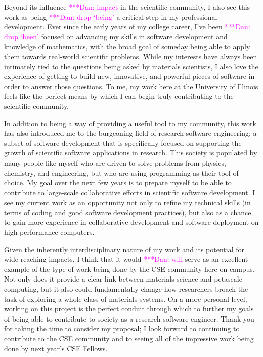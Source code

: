 \documentclass{article}
\newcommand{\katznote}[1]{ {\textcolor{magenta}    { ***Dan:      #1 }}}
\begin{document}
\bigskip

Beyond its influence \katznote{impact} in the scientific community, I also see this work as being \katznote{drop `being'} a critical step in my professional development. Ever since the early years of my college career, I've been \katznote{drop `been'} focused on advancing my skills in software development and knowledge of mathematics, with the broad goal of someday being able to apply them towards real-world scientific problems. While my interests have always been intimately tied to the questions being asked by materials scientists, I also love the experience of getting to build new, innovative, and powerful pieces of software in order to answer those questions. To me, my work here at the University of Illinois feels like the perfect means by which I can begin truly contributing to the scientific community.

In addition to being a way of providing a useful tool to my community, this work has also introduced me to the burgeoning field of research software engineering; a subset of software development that is specifically focused on supporting the growth of scientific software applications in research. This society is populated by many people like myself who are driven to solve problems from physics, chemistry, and engineering, but who are using programming as their tool of choice. My goal over the next few years is to prepare myself to be able to contribute to large-scale collaborative efforts in scientific software development. I see my current work as an opportunity not only to refine my technical skills (in terms of coding and good software development practices), but also as a chance to gain more experience in collaborative development and software deployment on high performance computers.

Given the inherently interdisciplinary nature of my work and its potential for wide-reaching impacts, I think that it would \katznote{will} serve as an excellent example of the type of work being done by the CSE community here on campus. Not only does it provide a clear link between materials science and petascale computing, but it also could fundamentally change how researchers broach the task of exploring a whole class of materials systems. On a more personal level, working on this project is the perfect conduit through which to further my goals of being able to contribute to society as a research software engineer. Thank you for taking the time to consider my proposal; I look forward to continuing to contribute to the CSE community and to seeing all of the impressive work being done by next year's CSE Fellows.



\end{document}
